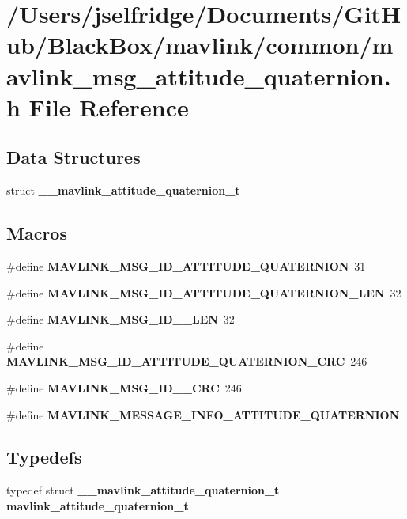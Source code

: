 \section{/\+Users/jselfridge/\+Documents/\+Git\+Hub/\+Black\+Box/mavlink/common/mavlink\+\_\+msg\+\_\+attitude\+\_\+quaternion.h File Reference}
\label{mavlink__msg__attitude__quaternion_8h}
\subsection*{Data Structures}
\begin{DoxyCompactItemize}
\item 
struct \textbf{ \+\_\+\+\_\+mavlink\+\_\+attitude\+\_\+quaternion\+\_\+t}
\end{DoxyCompactItemize}
\subsection*{Macros}
\begin{DoxyCompactItemize}
\item 
\#define \textbf{ M\+A\+V\+L\+I\+N\+K\+\_\+\+M\+S\+G\+\_\+\+I\+D\+\_\+\+A\+T\+T\+I\+T\+U\+D\+E\+\_\+\+Q\+U\+A\+T\+E\+R\+N\+I\+ON}~31
\item 
\#define \textbf{ M\+A\+V\+L\+I\+N\+K\+\_\+\+M\+S\+G\+\_\+\+I\+D\+\_\+\+A\+T\+T\+I\+T\+U\+D\+E\+\_\+\+Q\+U\+A\+T\+E\+R\+N\+I\+O\+N\+\_\+\+L\+EN}~32
\item 
\#define \textbf{ M\+A\+V\+L\+I\+N\+K\+\_\+\+M\+S\+G\+\_\+\+I\+D\+\_\+\_\+\+L\+EN}~32
\item 
\#define \textbf{ M\+A\+V\+L\+I\+N\+K\+\_\+\+M\+S\+G\+\_\+\+I\+D\+\_\+\+A\+T\+T\+I\+T\+U\+D\+E\+\_\+\+Q\+U\+A\+T\+E\+R\+N\+I\+O\+N\+\_\+\+C\+RC}~246
\item 
\#define \textbf{ M\+A\+V\+L\+I\+N\+K\+\_\+\+M\+S\+G\+\_\+\+I\+D\+\_\+\_\+\+C\+RC}~246
\item 
\#define \textbf{ M\+A\+V\+L\+I\+N\+K\+\_\+\+M\+E\+S\+S\+A\+G\+E\+\_\+\+I\+N\+F\+O\+\_\+\+A\+T\+T\+I\+T\+U\+D\+E\+\_\+\+Q\+U\+A\+T\+E\+R\+N\+I\+ON}
\end{DoxyCompactItemize}
\subsection*{Typedefs}
\begin{DoxyCompactItemize}
\item 
typedef struct \textbf{ \+\_\+\+\_\+mavlink\+\_\+attitude\+\_\+quaternion\+\_\+t} \textbf{ mavlink\+\_\+attitude\+\_\+quaternion\+\_\+t}
\end{DoxyCompactItemize}


